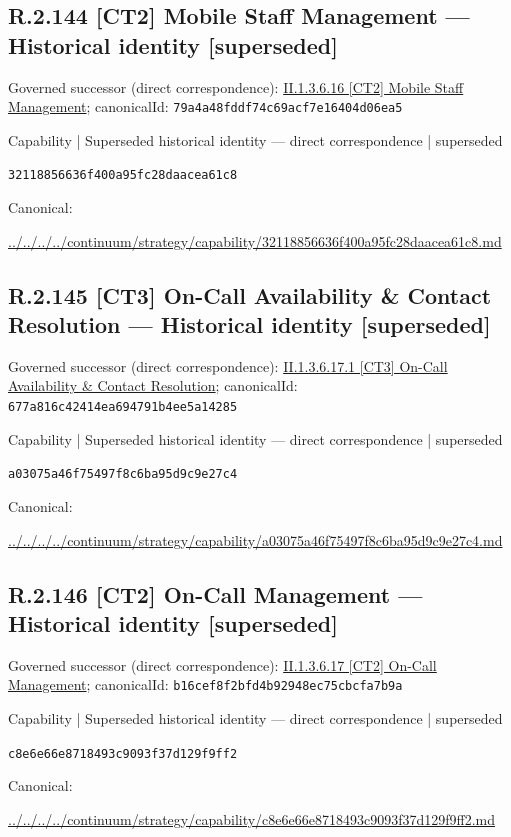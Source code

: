 \documentclass[10pt,a4paper]{article}
\begin{document}
\subsection*{R.2.144 [CT2] Mobile Staff Management — Historical identity [superseded]}
Governed successor (direct correspondence): \hyperref[element-79a4a48fddf74c69acf7e16404d06ea5]{II.1.3.6.16 [CT2] Mobile Staff Management}; canonicalId: \texttt{79a4a48fddf74c69acf7e16404d06ea5}\par
\label{element-32118856636f400a95fc28daacea61c8}
{\small Capability | Superseded historical identity — direct correspondence | superseded}\par
\texttt{32118856636f400a95fc28daacea61c8}\par
Canonical: \par
{\footnotesize\url{../../../../continuum/strategy/capability/32118856636f400a95fc28daacea61c8.md}}\par
\subsection*{R.2.145 [CT3] On-Call Availability \& Contact Resolution — Historical identity [superseded]}
Governed successor (direct correspondence): \hyperref[element-677a816c42414ea694791b4ee5a14285]{II.1.3.6.17.1 [CT3] On-Call Availability \& Contact Resolution}; canonicalId: \texttt{677a816c42414ea694791b4ee5a14285}\par
\label{element-a03075a46f75497f8c6ba95d9c9e27c4}
{\small Capability | Superseded historical identity — direct correspondence | superseded}\par
\texttt{a03075a46f75497f8c6ba95d9c9e27c4}\par
Canonical: \par
{\footnotesize\url{../../../../continuum/strategy/capability/a03075a46f75497f8c6ba95d9c9e27c4.md}}\par
\subsection*{R.2.146 [CT2] On-Call Management — Historical identity [superseded]}
Governed successor (direct correspondence): \hyperref[element-b16cef8f2bfd4b92948ec75cbcfa7b9a]{II.1.3.6.17 [CT2] On-Call Management}; canonicalId: \texttt{b16cef8f2bfd4b92948ec75cbcfa7b9a}\par
\label{element-c8e6e66e8718493c9093f37d129f9ff2}
{\small Capability | Superseded historical identity — direct correspondence | superseded}\par
\texttt{c8e6e66e8718493c9093f37d129f9ff2}\par
Canonical: \par
{\footnotesize\url{../../../../continuum/strategy/capability/c8e6e66e8718493c9093f37d129f9ff2.md}}\par
\end{document}
